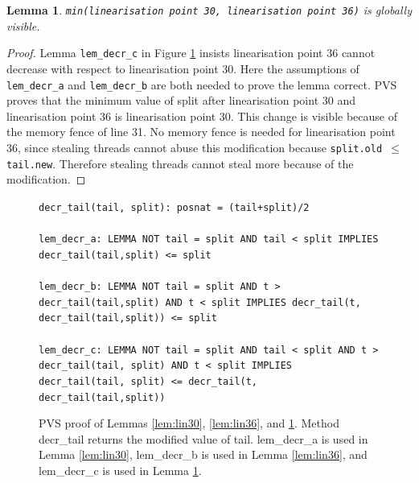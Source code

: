 \documentclass{sig-alternate-br}
\newtheorem{lemma}{Lemma}
\begin{document}
\begin{lemma}
	\texttt{min(linearisation point 30, linearisation point 36)} is globally visible.
	\label{lem:lin3036}
\end{lemma}
\begin{proof}
	Lemma \texttt{lem\_decr\_c} in Figure \ref{pvs:decrtail} insists linearisation point 36 cannot decrease with respect to linearisation point 30.
	Here the assumptions of \texttt{lem\_decr\_a} and \texttt{lem\_decr\_b} are both needed to prove the lemma correct.
	PVS proves that the minimum value of split after linearisation point 30 and linearisation point 36 is linearisation point 30.
	This change is visible because of the memory fence of line 31.
	No memory fence is needed for linearisation point 36, since stealing threads cannot abuse this modification because \texttt{split.old $\leq$ tail.new}.
	Therefore stealing threads cannot steal more because of the modification.	
\end{proof}
\begin{figure}[h]
	\texttt{decr\_tail(tail, split): posnat = (tail+split)/2}\\\\
	\texttt{lem\_decr\_a: LEMMA NOT tail = split AND tail < split IMPLIES decr\_tail(tail,split) <= split}\\\\
	\texttt{lem\_decr\_b: LEMMA NOT tail = split AND t > decr\_tail(tail,split) AND t < split IMPLIES decr\_tail(t, decr\_tail(tail,split)) <= split}\\\\
	\texttt{lem\_decr\_c: LEMMA NOT tail = split AND tail < split AND t > decr\_tail(tail, split) AND t < split IMPLIES decr\_tail(tail, split) <= decr\_tail(t, decr\_tail(tail,split))}
	\caption{PVS proof of Lemmas \ref{lem:lin30}, \ref{lem:lin36}, and \ref{lem:lin3036}. Method decr\_tail returns the modified value of tail. lem\_decr\_a is used in Lemma \ref{lem:lin30}, lem\_decr\_b is used in Lemma \ref{lem:lin36}, and lem\_decr\_c is used in Lemma \ref{lem:lin3036}.}
	\label{pvs:decrtail}
\end{figure}
\end{document}
